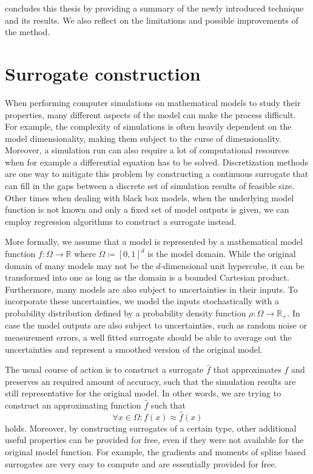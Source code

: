 \documentclass[
  a4paper,  %
  twoside,  %
  bibliography=totoc,
  headsepline,
  cleardoublepage=empty,
  parskip=half,
  draft=false
]{scrbook}
\begin{document}
 concludes this thesis by providing a summary of the newly introduced technique and its results.
We also reflect on the limitations and possible improvements of the method.

\chapter{Surrogate construction}
\label{chap:c2}

When performing computer simulations on mathematical models to study their properties, many different aspects of the model can make the process difficult.
For example, the complexity of simulations is often heavily dependent on the model dimensionality, making them subject to the curse of dimensionality.
Moreover, a simulation run can also require a lot of computational resources when for example a differential equation has to be solved.
Discretization methods are one way to mitigate this problem by constructing a continuous surrogate that can fill in the gaps between a discrete set of simulation results of feasible size.
Other times when dealing with black box models, \ie when the underlying model function is not known and only a fixed set of model outputs is given, we can employ regression algorithms to construct a surrogate instead.

More formally, we assume that a model is represented by a mathematical model function $f \colon \Omega \to \mathds{R}$ where $\Omega \coloneqq [0,1]^d$ is the model domain.
While the original domain of many models may not be the $d$-dimensional unit hypercube, it can be transformed into one as long as the domain is a bounded Cartesian product.
Furthermore, many models are also subject to uncertainties in their inputs.
To incorporate these uncertainties, we model the inputs stochastically with a probability distribution defined by a probability density function $\rho \colon \Omega \to \mathds{R_+}$.
In case the model outputs are also subject to uncertainties, such as random noise or measurement errors, a well fitted surrogate should be able to average out the uncertainties and represent a smoothed version of the original model.

The usual course of action is to construct a surrogate $\hat{f}$ that approximates $f$ and preserves an required amount of accuracy, such that the simulation results are still representative for the original model.
In other words, we are trying to construct an approximating function $\hat{f}$ such that
\begin{equation}
\forall x \in \Omega \colon f(x) \approx \hat{f}(x)
\end{equation}
holds.
Moreover, by constructing surrogates of a certain type, other additional useful properties can be provided for free, even if they were not available for the original model function.
For example, the gradients and moments of spline based surrogates are very easy to compute and are essentially provided for free.
\end{document}
